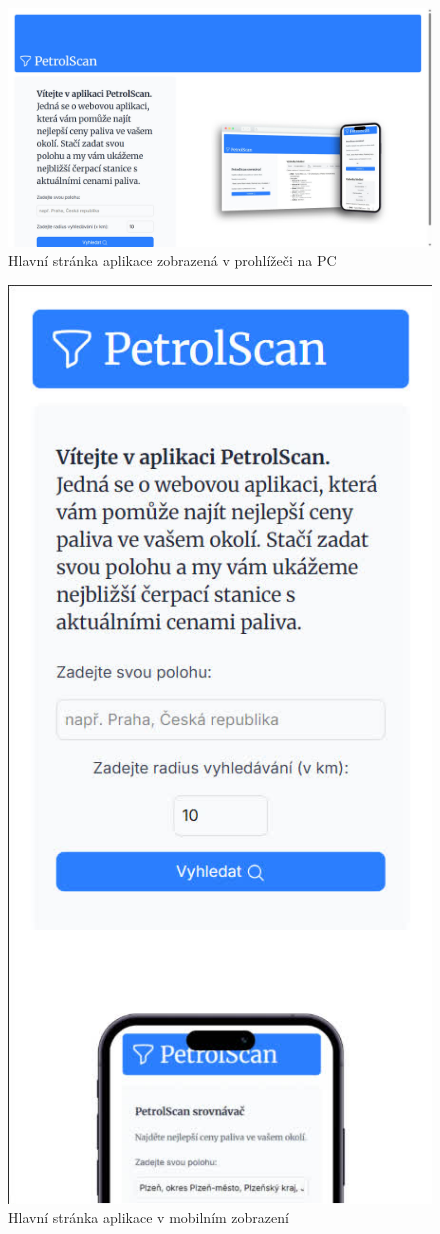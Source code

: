 \begin{figure}
    \centering
    \includegraphics[width=\textwidth]{Figures/web-home-desktop.jpg}
    \caption{Hlavní stránka aplikace zobrazená v prohlížeči na PC}
    \label{fig:web-home-desktop}
\end{figure}

\begin{figure}
    \centering
    \includegraphics[width=0.5\linewidth]{Figures/web-home-mobile.jpg}
    \caption{Hlavní stránka aplikace v mobilním zobrazení}
    \label{fig:web-home-mobile}
\end{figure}

